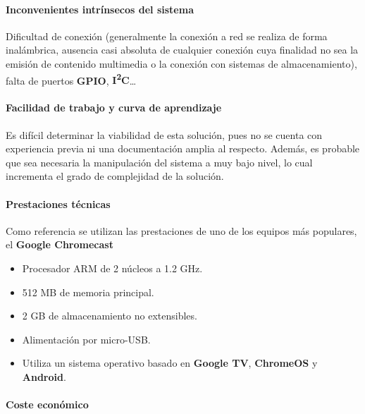 \paragraph{Inconvenientes intrínsecos del sistema\\}

Dificultad de conexión (generalmente la conexión a red se realiza de forma inalámbrica, ausencia casi absoluta de cualquier conexión cuya finalidad no sea la emisión de contenido multimedia o la conexión con sistemas de almacenamiento), falta de puertos \textbf{GPIO}, \textbf{I\textsuperscript{2}C}\dots

\paragraph{Facilidad de trabajo y curva de aprendizaje\\}

Es difícil determinar la viabilidad de esta solución, pues no se cuenta con experiencia previa ni una documentación amplia al respecto. Además, es probable que sea necesaria la manipulación del sistema a muy bajo nivel, lo cual incrementa el grado de complejidad de la solución.

\paragraph{Prestaciones técnicas\\}

Como referencia se utilizan las prestaciones de uno de los equipos más populares, el \textbf{Google Chromecast}
\begin{itemize}
  \item Procesador ARM de 2 núcleos a 1.2 GHz.
  \item 512 MB de memoria principal.
  \item 2 GB de almacenamiento no extensibles.
  \item Alimentación por micro-USB.
  \item Utiliza un sistema operativo basado en \textbf{Google TV}, \textbf{ChromeOS} y \textbf{Android}.
\end{itemize}

\paragraph{Coste económico\\}

